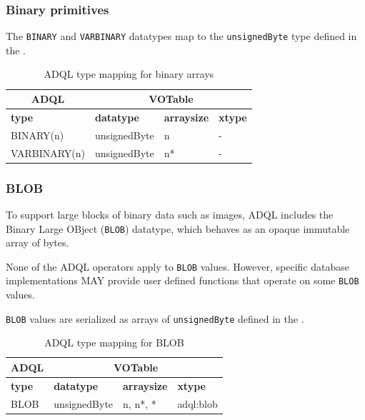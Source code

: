 \documentclass[11pt,a4paper]{ivoa}
\begin{document}
\subsubsection{Binary primitives}
\label{sec:types.binary.primitive}

The \verb:BINARY: and \verb:VARBINARY: datatypes map to the \verb:unsignedByte:
type defined in the \VOTableSpec{}.

\begin{table}[th]\footnotesize
    \begin{tabular}
        {|p{}|p{}|p{}|p{}|}
        
        \hline
        \multicolumn{1}{|c|}{\textbf{ADQL}} &
        \multicolumn{3}{|c|}{\textbf{VOTable}}
        \tabularnewline
        
        \hline
        \textbf{type} &
        \textbf{datatype} &
        \textbf{arraysize} &
        \textbf{xtype}
        \tabularnewline

        \hline
        BINARY(n) &
        unsignedByte &
        n &
        -
        \tabularnewline

        \hline
        VARBINARY(n) &
        unsignedByte &
        n* &
        -
        \tabularnewline
        \hline
    \end{tabular}
    \caption{ADQL type mapping for binary arrays}
    \label{table:types.binary.primitive}
\end{table}

\subsubsection{BLOB}
\label{sec:types.binary.blob}

To support large blocks of binary data such as images,
ADQL includes the Binary Large OBject (\verb:BLOB:) datatype,
which behaves as an opaque immutable array of bytes.

None of the ADQL operators apply to \verb:BLOB: values.
However, specific database implementations MAY provide user
defined functions that operate on some \verb:BLOB: values.

\verb:BLOB: values are serialized as arrays of \verb:unsignedByte: defined
in the \VOTableSpec{}.

\begin{table}[th]\footnotesize
    \begin{tabular}
        {|p{}|p{}|p{}|p{}|}
        
        \hline
        \multicolumn{1}{|c|}{\textbf{ADQL}} &
        \multicolumn{3}{|c|}{\textbf{VOTable}}
        \tabularnewline
        
        \hline
        \textbf{type} &
        \textbf{datatype} &
        \textbf{arraysize} &
        \textbf{xtype}
        \tabularnewline

        \hline
        BLOB &
        unsignedByte  &
        n, n*, * &
        adql:blob
        \tabularnewline
        \hline
    \end{tabular}
    \caption{ADQL type mapping for BLOB}
    \label{table:types.binary.blob}
\end{table}
\end{document}

